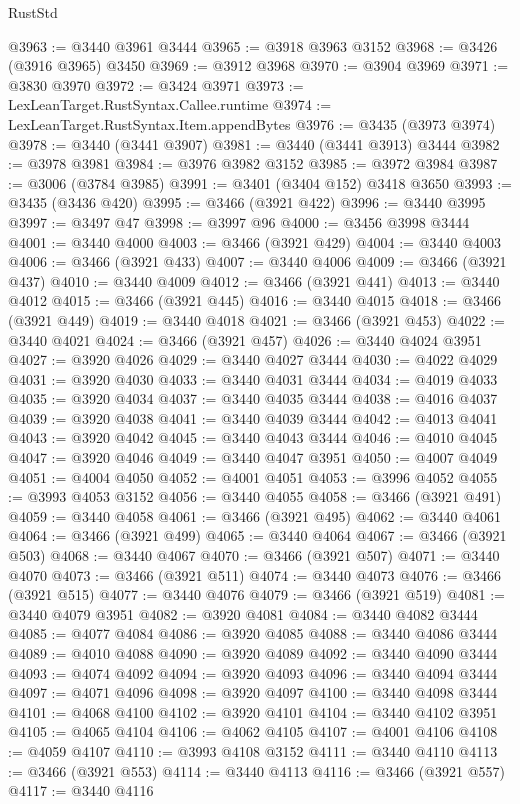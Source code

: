 \begin{lexlean}{RustStd}
\begin{coremodule}
@3963 := @3440 @3961 @3444
@3965 := @3918 @3963 @3152
@3968 := @3426 (@3916 @3965) @3450
@3969 := @3912 @3968
@3970 := @3904 @3969
@3971 := @3830 @3970
@3972 := @3424 @3971
@3973 := LexLeanTarget.RustSyntax.Callee.runtime
@3974 := LexLeanTarget.RustSyntax.Item.appendBytes
@3976 := @3435 (@3973 @3974)
@3978 := @3440 (@3441 @3907)
@3981 := @3440 (@3441 @3913) @3444
@3982 := @3978 @3981
@3984 := @3976 @3982 @3152
@3985 := @3972 @3984
@3987 := @3006 (@3784 @3985)
@3991 := @3401 (@3404 @152) @3418 @3650
@3993 := @3435 (@3436 @420)
@3995 := @3466 (@3921 @422)
@3996 := @3440 @3995
@3997 := @3497 @47
@3998 := @3997 @96
@4000 := @3456 @3998 @3444
@4001 := @3440 @4000
@4003 := @3466 (@3921 @429)
@4004 := @3440 @4003
@4006 := @3466 (@3921 @433)
@4007 := @3440 @4006
@4009 := @3466 (@3921 @437)
@4010 := @3440 @4009
@4012 := @3466 (@3921 @441)
@4013 := @3440 @4012
@4015 := @3466 (@3921 @445)
@4016 := @3440 @4015
@4018 := @3466 (@3921 @449)
@4019 := @3440 @4018
@4021 := @3466 (@3921 @453)
@4022 := @3440 @4021
@4024 := @3466 (@3921 @457)
@4026 := @3440 @4024 @3951
@4027 := @3920 @4026
@4029 := @3440 @4027 @3444
@4030 := @4022 @4029
@4031 := @3920 @4030
@4033 := @3440 @4031 @3444
@4034 := @4019 @4033
@4035 := @3920 @4034
@4037 := @3440 @4035 @3444
@4038 := @4016 @4037
@4039 := @3920 @4038
@4041 := @3440 @4039 @3444
@4042 := @4013 @4041
@4043 := @3920 @4042
@4045 := @3440 @4043 @3444
@4046 := @4010 @4045
@4047 := @3920 @4046
@4049 := @3440 @4047 @3951
@4050 := @4007 @4049
@4051 := @4004 @4050
@4052 := @4001 @4051
@4053 := @3996 @4052
@4055 := @3993 @4053 @3152
@4056 := @3440 @4055
@4058 := @3466 (@3921 @491)
@4059 := @3440 @4058
@4061 := @3466 (@3921 @495)
@4062 := @3440 @4061
@4064 := @3466 (@3921 @499)
@4065 := @3440 @4064
@4067 := @3466 (@3921 @503)
@4068 := @3440 @4067
@4070 := @3466 (@3921 @507)
@4071 := @3440 @4070
@4073 := @3466 (@3921 @511)
@4074 := @3440 @4073
@4076 := @3466 (@3921 @515)
@4077 := @3440 @4076
@4079 := @3466 (@3921 @519)
@4081 := @3440 @4079 @3951
@4082 := @3920 @4081
@4084 := @3440 @4082 @3444
@4085 := @4077 @4084
@4086 := @3920 @4085
@4088 := @3440 @4086 @3444
@4089 := @4010 @4088
@4090 := @3920 @4089
@4092 := @3440 @4090 @3444
@4093 := @4074 @4092
@4094 := @3920 @4093
@4096 := @3440 @4094 @3444
@4097 := @4071 @4096
@4098 := @3920 @4097
@4100 := @3440 @4098 @3444
@4101 := @4068 @4100
@4102 := @3920 @4101
@4104 := @3440 @4102 @3951
@4105 := @4065 @4104
@4106 := @4062 @4105
@4107 := @4001 @4106
@4108 := @4059 @4107
@4110 := @3993 @4108 @3152
@4111 := @3440 @4110
@4113 := @3466 (@3921 @553)
@4114 := @3440 @4113
@4116 := @3466 (@3921 @557)
@4117 := @3440 @4116

\end{coremodule}
\end{lexlean}
